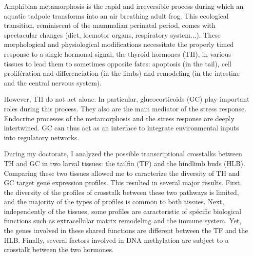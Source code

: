 % 
% 
%
Amphibian metamorphosis is the rapid and irreversible process during which an aquatic tadpole transforms into an air breathing adult frog.
This ecological transition, reminiscent of the mammalian perinatal period, comes with spectacular changes (diet, locmotor organs, respiratory system...).
These morphological and physiological modifications necessitate the properly timed response to a single hormonal signal, the thyroid hormones (TH), in various tissues to lead them to sometimes opposite fates:
apoptosis (in the tail), cell prolifération and differenciation (in the limbs) and remodeling (in the intestine and the central nervous system).
\par
However, TH do not act alone.
In particular, glucocorticoids (GC) play important roles during this process.
They also are the main mediator of the stress response.
Endocrine processes of the metamorphosis and the stress response are deeply intertwined.
GC can thus act as an interface to integrate environmental inputs into regulatory networks.
\par
During my doctorate, I analyzed the possible transcriptional crosstalks between TH and GC in two larval tissues: the tailfin (TF) and the hindlimb buds (HLB).
Comparing these two tissues allowed me to caracterize the diversity of TH and GC target gene expression profiles.
This resulted in several major results.
First, the diversity of the profiles of crosstalk between these two pathways is limited, and the majority of the types of profiles is common to both tissues.
Next, independently of the tissues, some profiles are caracteristic of spécific biological functions such as extracellular matrix remodeling and the immune system.
Yet, the genes involved in these shared functions are different between the TF and the HLB.
Finally, several factors involved in DNA methylation are subject to a crosstalk between the two hormones. 